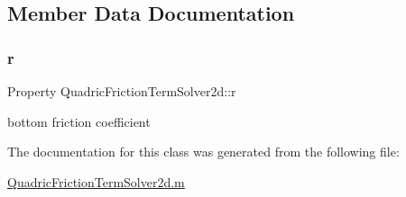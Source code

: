 \subsection{Member Data Documentation}
\mbox{\label{class_quadric_friction_term_solver2d_ae4bd9e4db9dc30c7d58e170668dc3f53}} 
\subsubsection{\texorpdfstring{r}{r}}
{\footnotesize\ttfamily Property Quadric\+Friction\+Term\+Solver2d\+::r}



bottom friction coefficient 



The documentation for this class was generated from the following file\+:\begin{DoxyCompactItemize}
\item 
\hyperlink{_quadric_friction_term_solver2d_8m}{Quadric\+Friction\+Term\+Solver2d.\+m}\end{DoxyCompactItemize}
